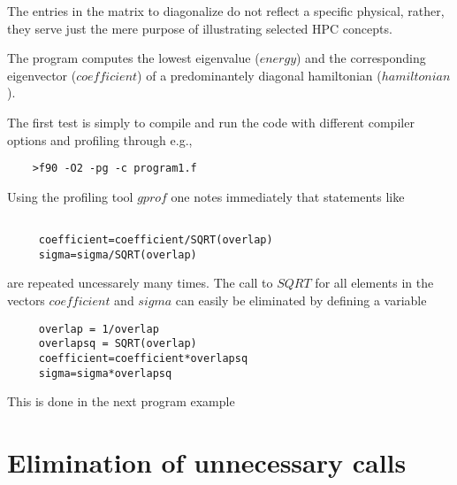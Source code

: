 The entries in the matrix to diagonalize do not reflect a specific
physical, rather, they serve just the mere purpose of illustrating selected
HPC concepts.

The program computes the lowest eigenvalue ($energy$) and the corresponding
eigenvector ($coefficient$)  of a predominantely diagonal hamiltonian
($hamiltonian$).

The first test is simply to compile and run the code with different compiler
options and profiling through e.g.,
\begin{verbatim}
    >f90 -O2 -pg -c program1.f
\end{verbatim}

Using the profiling tool $gprof$ one notes immediately that
statements like 
\begin{verbatim} 

     coefficient=coefficient/SQRT(overlap)
     sigma=sigma/SQRT(overlap)

\end{verbatim}
are repeated uncessarely many times. The call to $SQRT$ for all
elements in the vectors $coefficient$ and $sigma$ can easily be eliminated by
defining a variable 


\begin{verbatim} 
     overlap = 1/overlap
     overlapsq = SQRT(overlap)
     coefficient=coefficient*overlapsq
     sigma=sigma*overlapsq
\end{verbatim}

This is done in the next program example

\section{Elimination of unnecessary calls}

\begin{verbatim} 

\end{verbatim}





